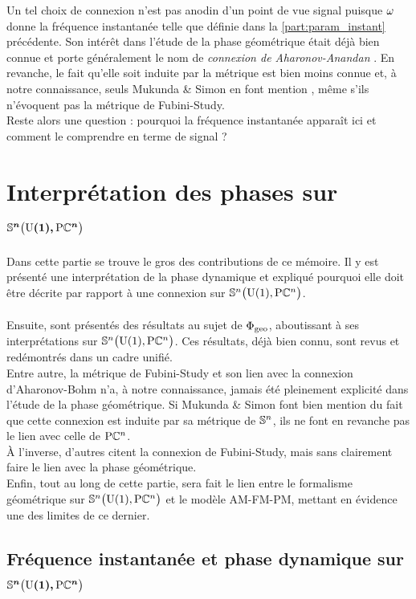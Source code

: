 Un tel choix de connexion n'est pas anodin d'un point de vue signal puisque $\conn$ donne la fréquence instantanée telle que définie dans la \cref{part:param_instant} précédente.
Son intérêt dans l'étude de la phase géométrique était déjà bien connue et porte généralement le nom de \emph{connexion de Aharonov-Anandan} \cite[sec. 4.2]{bohm_geometric_2003}. En revanche, le fait qu'elle soit induite par la métrique est bien moins connue et, à notre connaissance, seuls Mukunda \& Simon en font mention \cite{mukunda_quantum_1993}, même s'ils n'évoquent pas la métrique de Fubini-Study.
\\
Reste alors une question : pourquoi la fréquence instantanée apparaît ici et comment le comprendre en terme de signal ?
\\




\section{Interprétation des phases sur $\bf{\VFP}$} \label{sec:phases_dans_VFP}

Dans cette partie se trouve le gros des contributions de ce mémoire. Il y est présenté une interprétation de la phase dynamique et expliqué pourquoi elle doit être décrite par rapport à une connexion sur $\VFP$.
\\ \\
Ensuite, sont présentés des résultats au sujet de $\phaseg$, aboutissant à ses interprétations sur $\VFP$. Ces résultats, déjà bien connu, sont revus et redémontrés dans un cadre unifié. \\
Entre autre, la métrique de Fubini-Study et son lien avec la connexion d'Aharonov-Bohm n'a, à notre connaissance, jamais été pleinement explicité dans l'étude de la phase géométrique. 
Si Mukunda \& Simon font bien mention du fait que cette connexion est induite par sa métrique de $\S{n}$, ils ne font en revanche pas le lien avec celle de $\PC{n}$. \\
À l'inverse, d'autres \cite{nakahara_geometry_2003,faure_introduction_2022} citent la connexion de Fubini-Study, mais sans clairement faire le lien avec la phase géométrique.
\\

Enfin, tout au long de cette partie, sera fait le lien entre le formalisme géométrique sur $\VFP$ et le modèle AM-FM-PM, mettant en évidence une des limites de ce dernier.
\\

\subsection{Fréquence instantanée et phase dynamique sur $\bf{\VFP}$}
\label{subsec:phased-V_geodiff}

